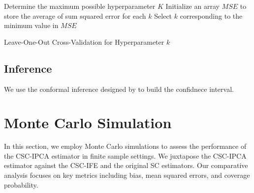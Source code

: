 \documentclass[12pt]{article}
\begin{document}
\begin{algorithm}[!ht]
    \SetAlgoLined
    Determine the maximum possible hyperparameter $K$\;
    Initialize an array $MSE$ to store the average of sum squared error for each $k$\;
      Select $k$ corresponding to the minimum value in $MSE$\;
    \caption{Leave-One-Out Cross-Validation for Hyperparameter $k$}
    \label{algorithm: 2}
\end{algorithm}
    
\subsection{Inference}
We use the conformal inference designed by \cite{chernozhukov2021exact} to build the confidnece interval.

\section{Monte Carlo Simulation}
\label{sec: simulation}

In this section, we employ Monte Carlo simulations to assess the performance of the CSC-IPCA estimator in finite sample settings. We juxtapose the CSC-IPCA estimator against the CSC-IFE and the original SC estimators. Our comparative analysis focuses on key metrics including bias, mean squared errors, and coverage probability. 
\end{document}
